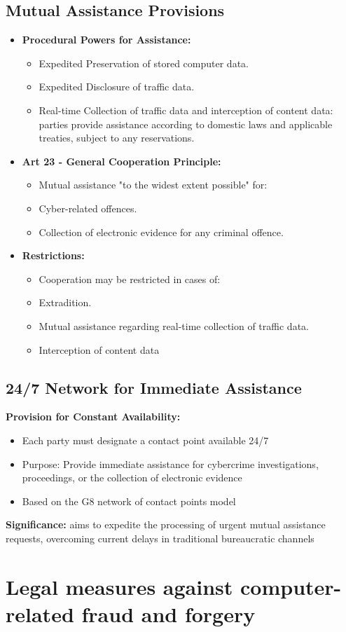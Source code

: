 \subsection{Mutual Assistance Provisions}
\begin{itemize}[itemsep=0pt]
  \item  \textbf{Procedural Powers for Assistance:}
    \begin{itemize}[itemsep=0pt]
      \item Expedited Preservation of stored computer data.
      \item Expedited Disclosure of traffic data.
      \item Real-time Collection of traffic data and interception of content data: parties provide assistance according to domestic laws and applicable treaties, subject to any reservations.
    \end{itemize}
  \item \textbf{Art 23 - General Cooperation Principle:}
    \begin{itemize}[itemsep=0pt]
      \item Mutual assistance "to the widest extent possible" for:
      \item Cyber-related offences.
      \item Collection of electronic evidence for any criminal offence.
    \end{itemize}
  \item \textbf{Restrictions:}
    \begin{itemize}[itemsep=0pt]
      \item Cooperation may be restricted in cases of:
      \item Extradition.
      \item Mutual assistance regarding real-time collection of traffic data.
      \item Interception of content data
    \end{itemize}
\end{itemize}

\subsection{24/7 Network for Immediate Assistance}
\textbf{Provision for Constant Availability:}
\begin{itemize}
  \item Each party must designate a contact point available 24/7
  \item Purpose: Provide immediate assistance for cybercrime investigations, proceedings, or the collection of electronic evidence
  \item Based on the G8 network of contact points model
\end{itemize}
\textbf{Significance:} aims to expedite the processing of urgent
mutual assistance requests, overcoming current delays in
traditional bureaucratic channels

\section{Legal measures against computer-related fraud and forgery}
